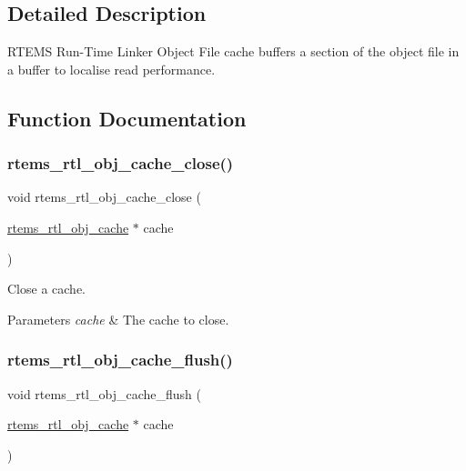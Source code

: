 \subsection{Detailed Description}
R\+T\+E\+MS Run-\/\+Time Linker Object File cache buffers a section of the object file in a buffer to localise read performance. 



\subsection{Function Documentation}
\mbox{\label{rtl-obj-cache_8c_af823408cc02aeceb7ab687c7d818ad1a}} 
\subsubsection{\texorpdfstring{rtems\_rtl\_obj\_cache\_close()}{rtems\_rtl\_obj\_cache\_close()}}
{\footnotesize\ttfamily void rtems\+\_\+rtl\+\_\+obj\+\_\+cache\+\_\+close (\begin{DoxyParamCaption}\item[{\mbox{\hyperlink{structrtems__rtl__obj__cache}{rtems\+\_\+rtl\+\_\+obj\+\_\+cache}} $\ast$}]{cache }\end{DoxyParamCaption})}

Close a cache.


\begin{DoxyParams}{Parameters}
{\em cache} & The cache to close. \\
\hline
\end{DoxyParams}
\mbox{\label{rtl-obj-cache_8c_a111b8cc86622e49926e5267d2be870e7}} 
\subsubsection{\texorpdfstring{rtems\_rtl\_obj\_cache\_flush()}{rtems\_rtl\_obj\_cache\_flush()}}
{\footnotesize\ttfamily void rtems\+\_\+rtl\+\_\+obj\+\_\+cache\+\_\+flush (\begin{DoxyParamCaption}\item[{\mbox{\hyperlink{structrtems__rtl__obj__cache}{rtems\+\_\+rtl\+\_\+obj\+\_\+cache}} $\ast$}]{cache }\end{DoxyParamCaption})}

